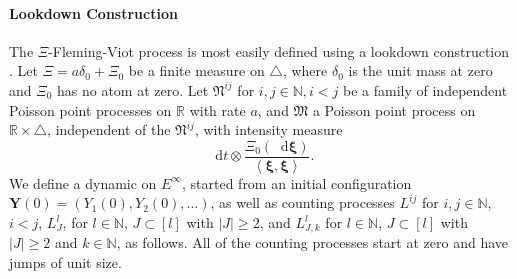 \documentclass[reqno,draft]{amsart}
\numberwithin{equation}{section}
\theoremstyle{plain}
\theoremstyle{remark}
\newcommand{\R}{\mathbb{R}} %
\newcommand{\N}{\mathbb{N}} %
\newcommand*\diff{\mathop{}\!\mathrm{d}}
\begin{document}
\medskip\paragraph{\textbf{Lookdown Construction}}
The $\Xi$-Fleming-Viot process is most easily defined using a lookdown construction \cite{DK96,DK99,xiflemingviot}.
 Let $\Xi = a \delta_0 + \Xi_0$ be a finite measure on $\triangle$, where $\delta_0$ is the unit mass at zero and $\Xi_0$ has no atom at zero.
 Let $\mathfrak{N}^{ij}$ for $i,j\in \N, i < j$ be a family of independent Poisson point processes on $\R$ with rate $a$, and $\mathfrak{M}$ a Poisson point process on $\R \times \triangle$, independent of the $\mathfrak{N}^{ij}$, with intensity measure \[
    \diff t \otimes \frac{\Xi_0(\diff \boldsymbol \xi)}{\left<\boldsymbol \xi,\boldsymbol \xi \right> }.
\] We define a dynamic on $E^\infty$, started from an initial configuration $\boldsymbol Y(0) = (Y_1(0),Y_2(0),\ldots )$, as well as counting processes $L^{ij}$ for $i,j\in \N$, $i < j$, $L^{l}_{J}$, for $l\in \N$, $J\subset [l]$ with $|J| \ge 2$, and $L^l_{J,k}$ for $l\in \N$, $J \subset [l]$ with $|J| \ge 2$ and $k \in \N$, as follows. All of the counting processes start at zero and have jumps of unit size.
\end{document}
